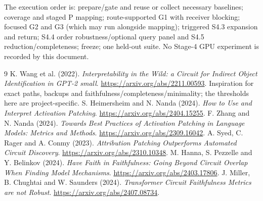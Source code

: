 \documentclass[11pt,a4paper]{article}
\begin{document}
The execution order is: prepare/gate and reuse or collect necessary baselines;
coverage and staged P mapping; route-supported G1 with receiver blocking; focused
G2 and G3 (which may run alongside mapping); triggered S4.3 expansion and return;
S4.4 order robustness/optional query panel and S4.5 reduction/completeness;
freeze; one held-out suite. No Stage-4 GPU experiment is recorded by this document.

\begin{thebibliography}{9}
 K. Wang et al. (2022). \emph{Interpretability in the Wild: a Circuit
for Indirect Object Identification in GPT-2 small}.
\url{https://arxiv.org/abs/2211.00593}. Inspiration for exact paths, backups and
faithfulness/completeness/minimality; the thresholds here are project-specific.
 S. Heimersheim and N. Nanda (2024). \emph{How to Use and Interpret
Activation Patching}. \url{https://arxiv.org/abs/2404.15255}.
 F. Zhang and N. Nanda (2024). \emph{Towards Best Practices of
Activation Patching in Language Models: Metrics and Methods}.
\url{https://arxiv.org/abs/2309.16042}.
 A. Syed, C. Rager and A. Conmy (2023). \emph{Attribution Patching
Outperforms Automated Circuit Discovery}. \url{https://arxiv.org/abs/2310.10348}.
 M. Hanna, S. Pezzelle and Y. Belinkov (2024). \emph{Have Faith in
Faithfulness: Going Beyond Circuit Overlap When Finding Model Mechanisms}.
\url{https://arxiv.org/abs/2403.17806}.
 J. Miller, B. Chughtai and W. Saunders (2024).
\emph{Transformer Circuit Faithfulness Metrics are not Robust}.
\url{https://arxiv.org/abs/2407.08734}.
\end{thebibliography}
\end{document}
